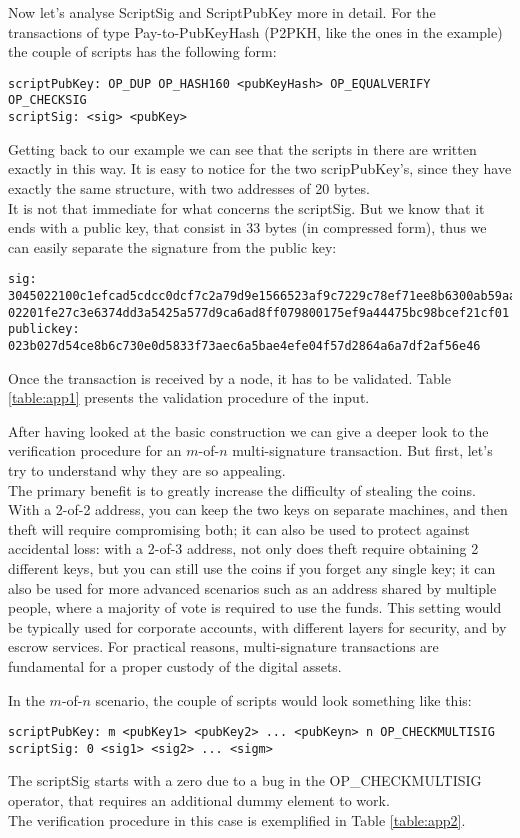 \bigskip
\noindent
Now let's analyse ScriptSig and ScriptPubKey more in detail. For the transactions of type Pay-to-PubKeyHash (P2PKH, like the ones in the example) the couple of scripts has the following form:
\begin{lstlisting}[frame=single]
scriptPubKey: OP_DUP OP_HASH160 <pubKeyHash> OP_EQUALVERIFY OP_CHECKSIG
scriptSig: <sig> <pubKey>
\end{lstlisting}
Getting back to our example we can see that the scripts in there are written exactly in this way. It is easy to notice for the two scripPubKey's, since they have exactly the same structure, with two addresses of 20 bytes.
\\
It is not that immediate for what concerns the scriptSig. But we know that it ends with a public key, that consist in 33 bytes (in compressed form), thus we can easily separate the signature from the public key:
\begin{lstlisting}[frame=single]
sig: 3045022100c1efcad5cdcc0dcf7c2a79d9e1566523af9c7229c78ef71ee8b6300ab59aa63d
02201fe27c3e6374dd3a5425a577d9ca6ad8ff079800175ef9a44475bc98bcef21cf01
publickey: 023b027d54ce8b6c730e0d5833f73aec6a5bae4efe04f57d2864a6a7df2af56e46
\end{lstlisting}
Once the transaction is received by a node, it has to be validated. Table \ref{table:app1} presents the validation procedure of the input.

\bigskip
\noindent
After having looked at the basic construction we can give a deeper look to the verification procedure for an $m$-of-$n$ multi-signature transaction. But first, let's try to understand why they are so appealing. 
\\
The primary benefit is to greatly increase the difficulty of stealing the coins. With a 2-of-2 address, you can keep the two keys on separate machines, and then theft will require compromising both; it can also be used to protect against accidental loss: with a 2-of-3 address, not only does theft require obtaining 2 different keys, but you can still use the coins if you forget any single key; it can also be used for more advanced scenarios such as an address shared by multiple people, where a majority of vote is required to use the funds. This setting would be typically used for corporate accounts, with different layers for security, and by escrow services. For practical reasons, multi-signature transactions are fundamental for a proper custody of the digital assets.

\bigskip
\noindent
In the $m$-of-$n$ scenario, the couple of scripts would look something like this:
\begin{lstlisting}[frame=single]
scriptPubKey: m <pubKey1> <pubKey2> ... <pubKeyn> n OP_CHECKMULTISIG
scriptSig: 0 <sig1> <sig2> ... <sigm>
\end{lstlisting}
The scriptSig starts with a zero due to a bug in the OP\_CHECKMULTISIG operator, that requires an additional dummy element to work.
\\		
The verification procedure in this case is exemplified in Table \ref{table:app2}.

